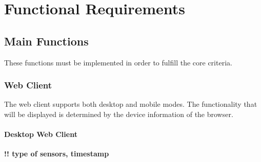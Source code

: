 \section{Functional Requirements}

\subsection{Main Functions}
These functions must be implemented in order to fulfill the core criteria.

\subsubsection{Web Client}
The web client supports both desktop and mobile modes. The functionality that will be displayed is determined by the device information of the browser.

\paragraph{Desktop Web Client}
\textbf{!! type of sensors, timestamp}


\def\twodigits#1{%
  \ifnum#1<10 0\fi
  \number#1}

